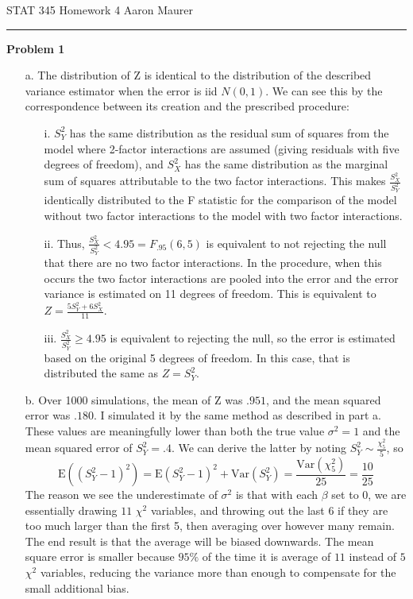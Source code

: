 \documentclass[11pt]{article}
\newcommand{\E}{\mathrm{E}}
\newcommand{\var}{\mathrm{Var}}
\theoremstyle{definition}
\begin{document}
STAT 345 Homework 4 \hfill Aaron Maurer
\vspace{2mm}
\hrule
\vspace{2mm}
{\bf Problem 1}
\begin{itemize}
    \item[a.]
        The distribution of Z is identical to the distribution of the described variance estimator when the error is iid $N(0,1)$. We can see this by the correspondence between its creation and the prescribed procedure:
        \begin{itemize}
            \item[i.] $S_Y^2$ has the same distribution as the residual sum of squares from the model where 2-factor interactions are assumed (giving residuals with five degrees of freedom), and $S_X^2$ has the same distribution as the marginal sum of squares attributable to the two factor interactions. This makes \(\frac{S_X^2}{S_Y^2}\) identically distributed to the F statistic for the comparison of the model without two factor interactions to the model with two factor interactions. 
            \item[ii.] Thus, $\frac{S_X^2}{S_Y^2}<4.95 = F_{.95}(6,5)$ is equivalent to not rejecting the null that there are no two factor interactions. In the procedure, when this occurs the two factor interactions are pooled into the error and the error variance is estimated on 11 degrees of freedom. This is equivalent to \(Z=\frac{5S_Y^2+6S_X^2}{11}\).
            \item[iii.] $\frac{S_X^2}{S_Y^2}\geq4.95$ is equivalent to rejecting the null, so the error is estimated based on the original 5 degrees of freedom. In this case, that is distributed the same as $Z=S_Y^2$.
        \end{itemize}
    \item[b.] Over 1000 simulations, the mean of Z was $.951$, and the mean squared error was $.180$. I simulated it by the same method as described in part a. These values are meaningfully lower than both the true value $\sigma^2=1$ and the mean squared error of $S_Y^2=.4$. We can derive the latter by noting $S_Y^2\sim \frac{\chi_5^2}{5}$, so
        \[ \E((S_Y^2-1)^2)= \E(S_Y^2-1)^2 + \var(S_Y^2) = \frac{\var(\chi_5^2)}{25} = \frac{10}{25} \] 
        The reason we see the underestimate of $\sigma^2$ is that with each $\beta$ set to 0, we are essentially drawing $11$ $\chi^2$ variables, and throwing out the last 6 if they are too much larger than the first 5, then averaging over however many remain. The end result is that the average will be biased downwards. The mean square error is smaller because $95\%$ of the time it is average of $11$ instead of $5$ $\chi^2$ variables, reducing the variance more than enough to compensate for the small additional bias.

\end{itemize}
\end{document}
